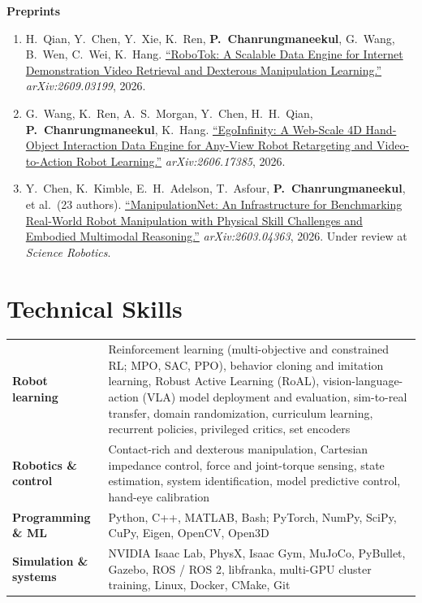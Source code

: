 \documentclass[10pt,letterpaper]{article}
\newcommand{\me}{\textbf{P.~Chanrungmaneekul}}
\newcommand{\venue}[1]{\textit{#1}}
\begin{document}
{\textbf{Preprints}\par\nopagebreak
\begin{enumerate}[resume]
  \item H.~Qian, Y.~Chen, Y.~Xie, K.~Ren, \me, G.~Wang, B.~Wen, C.~Wei, K.~Hang. \href{https://arxiv.org/abs/2609.03199}{``RoboTok: A Scalable Data Engine
    for Internet Demonstration Video Retrieval and Dexterous Manipulation Learning.''} \venue{arXiv:2609.03199}, 2026.
  \item G.~Wang, K.~Ren, A.~S.~Morgan, Y.~Chen, H.~H.~Qian, \me, K.~Hang. \href{https://arxiv.org/abs/2606.17385}{``EgoInfinity: A Web-Scale 4D Hand-Object
    Interaction Data Engine for Any-View Robot Retargeting and Video-to-Action Robot Learning.''}
    \venue{arXiv:2606.17385}, 2026.
  \item Y.~Chen, K.~Kimble, E.~H.~Adelson, T.~Asfour, \me, et al.\ (23 authors). \href{https://arxiv.org/abs/2603.04363}{``ManipulationNet: An Infrastructure
    for Benchmarking Real-World Robot Manipulation with Physical Skill Challenges and Embodied Multimodal Reasoning.''}
    \venue{arXiv:2603.04363}, 2026. Under review at \venue{Science Robotics}.
\end{enumerate}
}

\section{Technical Skills}
\begin{tabularx}{\linewidth}{@{}l@{\hspace{6pt}}>{\raggedright\arraybackslash}X@{}}
  \textbf{Robot learning} & Reinforcement learning (multi-objective and constrained RL; MPO, SAC, PPO), behavior cloning and
    imitation learning, Robust Active Learning (RoAL), vision-language-action (VLA) model deployment and evaluation,
    sim-to-real transfer, domain randomization, curriculum learning, recurrent policies, privileged critics, set encoders \\
  \textbf{Robotics \& control} & Contact-rich and dexterous manipulation, Cartesian impedance control, force and joint-torque
    sensing, state estimation, system identification, model predictive control, hand-eye calibration \\
  \textbf{Programming \& ML} & Python, C++, MATLAB, Bash; PyTorch, NumPy, SciPy, CuPy, Eigen, OpenCV, Open3D \\
  \textbf{Simulation \& systems} & NVIDIA Isaac Lab, PhysX, Isaac Gym, MuJoCo, PyBullet, Gazebo, ROS / ROS 2, libfranka,
    multi-GPU cluster training, Linux, Docker, CMake, Git \\
\end{tabularx}
\end{document}
